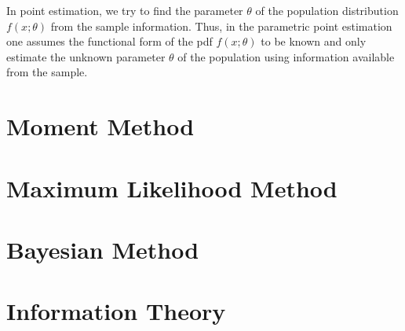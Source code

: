 In point estimation, we try to find the parameter $\theta$ of the
population distribution $f(x;\theta)$ from the sample information. 
Thus, in the parametric point estimation one assumes the functional 
form of the pdf $f(x;\theta)$ to be known and only estimate the unknown
parameter $\theta$ of the population using information available from
the sample.
\section{Moment Method}

\section{Maximum Likelihood Method}

\section{Bayesian Method}

\section{Information Theory}

